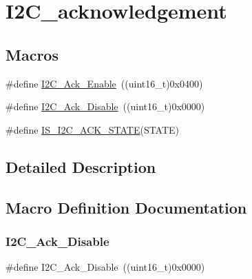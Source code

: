 \hypertarget{group___i2_c__acknowledgement}{}\section{I2\+C\+\_\+acknowledgement}
\label{group___i2_c__acknowledgement}
\subsection*{Macros}
\begin{DoxyCompactItemize}
\item 
\#define \mbox{\hyperlink{group___i2_c__acknowledgement_ga616466f8ef5a47237cdbf7ac578ec507}{I2\+C\+\_\+\+Ack\+\_\+\+Enable}}~((uint16\+\_\+t)0x0400)
\item 
\#define \mbox{\hyperlink{group___i2_c__acknowledgement_gadb5f47c052ac6bae1aa58c724e339e36}{I2\+C\+\_\+\+Ack\+\_\+\+Disable}}~((uint16\+\_\+t)0x0000)
\item 
\#define \mbox{\hyperlink{group___i2_c__acknowledgement_ga6401bedc842e784a2bb78b3aa21af19d}{I\+S\+\_\+\+I2\+C\+\_\+\+A\+C\+K\+\_\+\+S\+T\+A\+TE}}(S\+T\+A\+TE)
\end{DoxyCompactItemize}


\subsection{Detailed Description}


\subsection{Macro Definition Documentation}
\mbox{\label{group___i2_c__acknowledgement_gadb5f47c052ac6bae1aa58c724e339e36}} 
\subsubsection{\texorpdfstring{I2C\_Ack\_Disable}{I2C\_Ack\_Disable}}
{\footnotesize\ttfamily \#define I2\+C\+\_\+\+Ack\+\_\+\+Disable~((uint16\+\_\+t)0x0000)}

\mbox{\label{group___i2_c__acknowledgement_ga616466f8ef5a47237cdbf7ac578ec507}} 

